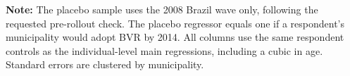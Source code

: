 
\begin{minipage}{\textwidth}
\footnotesize
\textbf{Note:} The placebo sample uses the 2008 Brazil wave only, following the requested pre-rollout check. The placebo regressor equals one if a respondent's municipality would adopt BVR by 2014. All columns use the same respondent controls as the individual-level main regressions, including a cubic in age. Standard errors are clustered by municipality.
\end{minipage}
